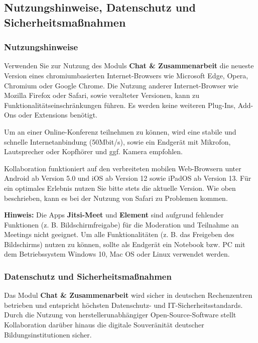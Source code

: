 \documentclass[
  letterpaper,
  DIV=11,
  numbers=noendperiod]{scrreprt}
\begin{document}
\subsection{Nutzungshinweise, Datenschutz und
Sicherheitsmaßnahmen}\label{nutzungshinweise-datenschutz-und-sicherheitsmauxdfnahmen}

\subsubsection{Nutzungshinweise}\label{nutzungshinweise}

Verwenden Sie zur Nutzung des Moduls \textbf{Chat \& Zusammenarbeit} die
neueste Version eines chromiumbasierten Internet-Browsers wie Microsoft
Edge, Opera, Chromium oder Google Chrome. Die Nutzung anderer
Internet-Browser wie Mozilla Firefox oder Safari, sowie veralteter
Versionen, kann zu Funktionalitätseinschränkungen führen. Es werden
keine weiteren Plug-Ins, Add-Ons oder Extensions benötigt.

Um an einer Online-Konferenz teilnehmen zu können, wird eine stabile und
schnelle Internetanbindung (50Mbit/s), sowie ein Endgerät mit Mikrofon,
Lautsprecher oder Kopfhörer und ggf. Kamera empfohlen.

Kollaboration funktioniert auf den verbreiteten mobilen Web-Browsern
unter Android ab Version 5.0 und iOS ab Version 12 sowie iPadOS ab
Version 13. Für ein optimales Erlebnis nutzen Sie bitte stets die
aktuelle Version. Wie oben beschrieben, kann es bei der Nutzung von
Safari zu Problemen kommen.

\textbf{Hinweis:} Die Apps \textbf{Jitsi-Meet} und \textbf{Element} sind
aufgrund fehlender Funktionen (z. B. Bildschirmfreigabe) für die
Moderation und Teilnahme an Meetings nicht geeignet. Um alle
Funktionalitäten (z. B. das Freigeben des Bildschirms) nutzen zu können,
sollte als Endgerät ein Notebook bzw. PC mit dem Betriebssystem Windows
10, Mac OS oder Linux verwendet werden.

\subsubsection{Datenschutz und
Sicherheitsmaßnahmen}\label{datenschutz-und-sicherheitsmauxdfnahmen}

Das Modul \textbf{Chat \& Zusammenarbeit} wird sicher in deutschen
Rechenzentren betrieben und entspricht höchsten Datenschutz- und
IT-Sicherheitsstandards. Durch die Nutzung von herstellerunabhängiger
Open-Source-Software stellt Kollaboration darüber hinaus die digitale
Souveränität deutscher Bildungsinstitutionen sicher.
\end{document}
